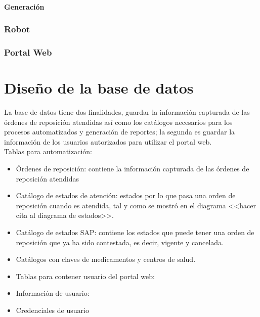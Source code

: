 \paragraph{Generación}

\subsubsection{Robot}

\subsubsection{Portal Web}





\section{Diseño de la base de datos}
La base de datos tiene dos finalidades, guardar la información capturada de las órdenes de reposición atendidas así como los catálogos necesarios para los procesos automatizados y generación de reportes; la segunda es guardar la información de los usuarios autorizados para utilizar el portal web.\\
Tablas para automatización:
\begin{itemize}
	\item Órdenes de reposición: contiene la información capturada de las órdenes de reposición atendidas
	\item Catálogo de estados de atención: estados por lo que pasa una orden de reposición cuando es atendida, tal y como se mostró en el diagrama <<hacer cita al diagrama de estados>>.
	\item Catálogo de estados SAP: contiene los estados que puede tener una orden de reposición que ya ha sido contestada, es decir, vigente y cancelada.
	\item Catálogos con claves de medicamentos y centros de salud.
	\item Tablas para contener usuario del portal web:
	\item Información de usuario: 
	\item Credenciales de usuario
\end{itemize}




